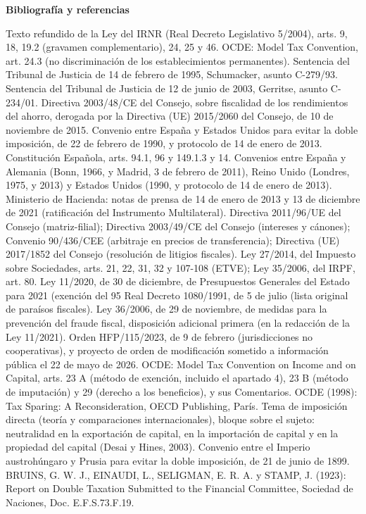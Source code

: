 \documentclass[10pt,a4paper]{article}
\newcounter{myref}
\newcommand{\MyBibliography}{%
  \clearpage
  \phantomsection
  {\centering\bfseries\Large Bibliografía y referencias\par}%
  \medskip
  \addcontentsline{stc}{section}{Bibliografía y referencias}%
  \setcounter{myref}{0}%
}
\begin{document}
\clearpage
{}
\MyBibliography

Texto refundido de la Ley del IRNR (Real Decreto Legislativo 5/2004), arts. 9, 18, 19.2 (gravamen complementario), 24, 25 y 46.
OCDE: Model Tax Convention, art. 24.3 (no discriminación de los establecimientos permanentes).
Sentencia del Tribunal de Justicia de 14 de febrero de 1995, Schumacker, asunto C-279/93.
Sentencia del Tribunal de Justicia de 12 de junio de 2003, Gerritse, asunto C-234/01.
Directiva 2003/48/CE del Consejo, sobre fiscalidad de los rendimientos del ahorro, derogada por la Directiva (UE) 2015/2060 del Consejo, de 10 de noviembre de 2015.
Convenio entre España y Estados Unidos para evitar la doble imposición, de 22 de febrero de 1990, y protocolo de 14 de enero de 2013.
Constitución Española, arts. 94.1, 96 y 149.1.3 y 14.
Convenios entre España y Alemania (Bonn, 1966, y Madrid, 3 de febrero de 2011), Reino Unido (Londres, 1975, y 2013) y Estados Unidos (1990, y protocolo de 14 de enero de 2013).
Ministerio de Hacienda: notas de prensa de 14 de enero de 2013 y 13 de diciembre de 2021 (ratificación del Instrumento Multilateral).
Directiva 2011/96/UE del Consejo (matriz-filial); Directiva 2003/49/CE del Consejo (intereses y cánones); Convenio 90/436/CEE (arbitraje en precios de transferencia); Directiva (UE) 2017/1852 del Consejo (resolución de litigios fiscales).
Ley 27/2014, del Impuesto sobre Sociedades, arts. 21, 22, 31, 32 y 107-108 (ETVE); Ley 35/2006, del IRPF, art. 80.
Ley 11/2020, de 30 de diciembre, de Presupuestos Generales del Estado para 2021 (exención del 95%
Real Decreto 1080/1991, de 5 de julio (lista original de paraísos fiscales).
Ley 36/2006, de 29 de noviembre, de medidas para la prevención del fraude fiscal, disposición adicional primera (en la redacción de la Ley 11/2021).
Orden HFP/115/2023, de 9 de febrero (jurisdicciones no cooperativas), y proyecto de orden de modificación sometido a información pública el 22 de mayo de 2026.
OCDE: Model Tax Convention on Income and on Capital, arts. 23 A (método de exención, incluido el apartado 4), 23 B (método de imputación) y 29 (derecho a los beneficios), y sus Comentarios.
OCDE (1998): Tax Sparing: A Reconsideration, OECD Publishing, París.
Tema de imposición directa (teoría y comparaciones internacionales), bloque sobre el sujeto: neutralidad en la exportación de capital, en la importación de capital y en la propiedad del capital (Desai y Hines, 2003).
Convenio entre el Imperio austrohúngaro y Prusia para evitar la doble imposición, de 21 de junio de 1899.
BRUINS, G. W. J., EINAUDI, L., SELIGMAN, E. R. A. y STAMP, J. (1923): Report on Double Taxation Submitted to the Financial Committee, Sociedad de Naciones, Doc. E.F.S.73.F.19.
\end{document}
